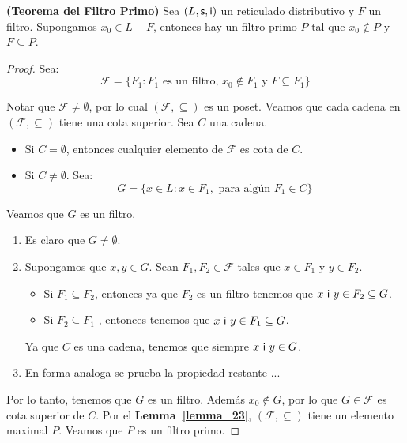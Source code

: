   \begin{theorem} \label{theorem_24}
    \PN \textbf{(Teorema del Filtro Primo)} Sea $(L, \mathsf{s}, \mathsf{i})$ un reticulado distributivo y $F$ un filtro. Supongamos
    $x_{0} \in L-F$, entonces hay un filtro primo $P$ tal que $x_{0} \notin P$ y $F \subseteq P$.
  \end{theorem}
  \begin{proof}
    \PN Sea:
    \[
      \mathcal{F} = \{F_{1}: F_{1} \text{ es un filtro, } x_{0} \notin F_{1} \text{ y } F \subseteq F_{1}\}
    \]

    \PN Notar que $\mathcal{F} \neq \emptyset$, por lo cual $(\mathcal{F}, \subseteq)$ es un poset.
    \PN Veamos que cada cadena en $(\mathcal{F}, \subseteq)$ tiene una cota superior. Sea $C$ una cadena.
    \begin{itemize}
      \item Si $C = \emptyset$, entonces cualquier elemento de $\mathcal{F}$ es cota de $C$.
      \item Si $C \neq \emptyset$. Sea:
        \[
          G = \{x \in L: x \in F_{1}, \text{ para algún } F_{1} \in C\}
        \]
    \end{itemize}

    \PN Veamos que $G$ es un filtro.
    \begin{enumerate}
      \item Es claro que $G \neq \emptyset$.
      \item Supongamos que $ x,y\in G$. Sean $F_{1},F_{2}\in \mathcal{F}$ tales que $x\in F_{1}$ y $y\in F_{2}$.
      \begin{itemize}
        \item Si $F_{1}\subseteq F_{2}$, entonces ya que $F_{2}$ es un filtro tenemos que $x \ \mathsf{i} \ y\in F_{2}\subseteq G$.
        \item Si $F_{2}\subseteq F_{1}$ , entonces tenemos que $x \ \mathsf{i} \ y \in F_{1} \subseteq G$.
      \end{itemize}
      \PN Ya que $C$ es una cadena, tenemos que siempre $x \ \IN \ y \in G$.

      \item En forma analoga se prueba la propiedad restante ...
    \end{enumerate}

    \PN Por lo tanto, tenemos que $G$ es un filtro. Además $x_{0} \notin G$, por lo que $G \in \mathcal{F}$ es cota
    superior de $C$. Por el \textbf{Lemma~\ref{lemma_23}}, $(\mathcal{F}, \subseteq)$ tiene un elemento maximal $P$.
    Veamos que $P$ es un filtro primo.


\end{proof}
